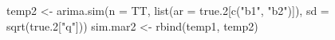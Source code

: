 \begin{Schunk}
\begin{Sinput}
 temp2 <- arima.sim(n = TT, list(ar = true.2[c("b1", "b2")]), 
                    sd = sqrt(true.2["q"]))
 sim.mar2 <- rbind(temp1, temp2)
\end{Sinput}
\end{Schunk}
